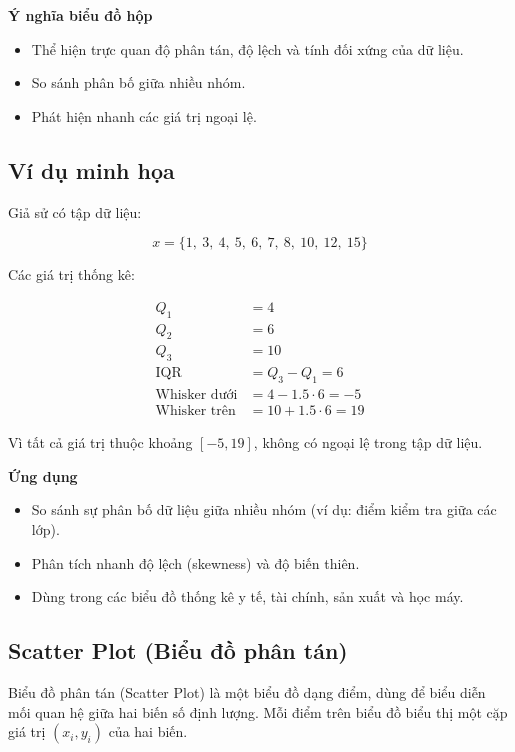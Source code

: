 \textbf{Ý nghĩa biểu đồ hộp}

\begin{itemize}
    \item Thể hiện trực quan độ phân tán, độ lệch và tính đối xứng của dữ liệu.
    \item So sánh phân bố giữa nhiều nhóm.
    \item Phát hiện nhanh các giá trị ngoại lệ.
\end{itemize}

\subsection*{Ví dụ minh họa}

Giả sử có tập dữ liệu:

\[
x = \{1,\ 3,\ 4,\ 5,\ 6,\ 7,\ 8,\ 10,\ 12,\ 15\}
\]

\noindent Các giá trị thống kê:

\begin{align*}
    Q_1 &= 4 \\
    Q_2 &= 6 \\
    Q_3 &= 10 \\
    \text{IQR} &= Q_3 - Q_1 = 6 \\
    \text{Whisker dưới} &= 4 - 1.5 \cdot 6 = -5 \\
    \text{Whisker trên} &= 10 + 1.5 \cdot 6 = 19
\end{align*}

\noindent Vì tất cả giá trị thuộc khoảng \([-5, 19]\), không có ngoại lệ trong tập dữ liệu.

\textbf{Ứng dụng}

\begin{itemize}
    \item So sánh sự phân bố dữ liệu giữa nhiều nhóm (ví dụ: điểm kiểm tra giữa các lớp).
    \item Phân tích nhanh độ lệch (skewness) và độ biến thiên.
    \item Dùng trong các biểu đồ thống kê y tế, tài chính, sản xuất và học máy.
\end{itemize}

\subsection {Scatter Plot (Biểu đồ phân tán)}
\label{graph:scatter}

Biểu đồ phân tán (Scatter Plot) là một biểu đồ dạng điểm, dùng để biểu diễn mối quan hệ giữa hai biến số định lượng. Mỗi điểm trên biểu đồ biểu thị một cặp giá trị \((x_i, y_i)\) của hai biến.


